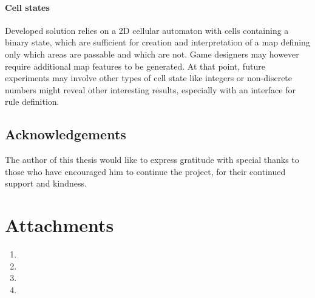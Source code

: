 \documentclass[12pt]{report}
\begin{document}
\subsubsection{Cell states}

Developed solution relies on a 2D cellular automaton with cells containing a binary state, which are sufficient for creation and interpretation of a map defining only which areas are passable and which are not. Game designers may however require additional map features to be generated. At that point, future experiments may involve other types of cell state like integers or non-discrete numbers might reveal other interesting results, especially with an interface for rule definition. 

\section{Acknowledgements}

The author of this thesis would like to express gratitude with special thanks to those who have encouraged him to continue the project, for their continued support and kindness.

\printbibliography[heading=bibintoc]

\listoffigures

\listoftables 

\chapter*{Attachments}
\begin{enumerate}  
	\item 
	\item 
	\item 
	\item
\end{enumerate} 
\end{document}
